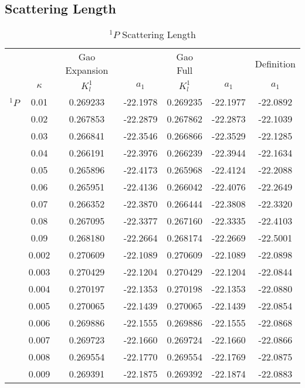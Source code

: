 \documentclass[Dissertation.tex]{subfiles}
\begin{document}
\subsection{Scattering Length}

\begin{table}[H]
	\centering
	\normalsize
	\begin{tabular}{c c | c c | c c | c}
	\toprule
			& & Gao Expansion & & Gao Full & & Definition \\
			& $\kappa$ & $K_l^1$ & $a_1$ & $K_l^1$ & $a_1$ & $a_1$ \\
	\midrule
		$^1P$ & 0.01 & 0.269233 & -22.1978 & 0.269235 & -22.1977 & -22.0892\\
			 & 	0.02 & 	0.267853 & -22.2879 & 0.267862 & -22.2873 & -22.1039\\
			 & 	0.03 & 	0.266841 & -22.3546 & 0.266866 & -22.3529 & -22.1285\\
			 & 	0.04 & 	0.266191 & -22.3976 & 0.266239 & -22.3944 & -22.1634\\
			 & 	0.05 & 	0.265896 & -22.4173 & 0.265968 & -22.4124 & -22.2088\\
			 & 	0.06 & 	0.265951 & -22.4136 & 0.266042 & -22.4076 & -22.2649\\
			 & 	0.07 & 	0.266352 & -22.3870 & 0.266444 & -22.3808 & -22.3320\\
			 & 	0.08 & 	0.267095 & -22.3377 & 0.267160 & -22.3335 & -22.4103\\
			 & 	0.09 & 	0.268180 & -22.2664 & 0.268174 & -22.2669 & -22.5001\\
	\midrule
			 & 	0.002 & 0.270609 & -22.1089 & 0.270609 & -22.1089 & -22.0898\\
			 & 	0.003 & 0.270429 & -22.1204 & 0.270429 & -22.1204 & -22.0844\\
			 & 	0.004 & 0.270197 & -22.1353 & 0.270198 & -22.1353 & -22.0880\\
			 & 	0.005 & 0.270065 & -22.1439 & 0.270065 & -22.1439 & -22.0854\\
			 & 	0.006 & 0.269886 & -22.1555 & 0.269886 & -22.1555 & -22.0868\\
			 & 	0.007 & 0.269723 & -22.1660 & 0.269724 & -22.1660 & -22.0866\\
			 & 	0.008 & 0.269554 & -22.1770 & 0.269554 & -22.1769 & -22.0875\\
			 & 	0.009 & 0.269391 & -22.1875 & 0.269392 & -22.1874 & -22.0883\\
	\bottomrule
	\end{tabular}
	\caption{$^1P$ Scattering Length}
	\label{tab:PWaveScatLen1}
\end{table}
\end{document}
